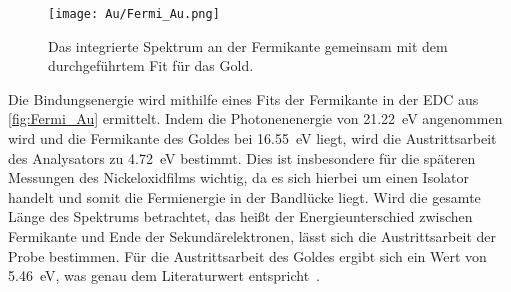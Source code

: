         \begin{figure}
            \centering
            \texttt{[image: Au/Fermi\_Au.png]}
            \caption{Das integrierte Spektrum an der Fermikante gemeinsam mit dem durchgeführtem Fit für das Gold.}
            \label{fig:Fermi_Au}
        \end{figure}
        Die Bindungsenergie wird mithilfe eines Fits der Fermikante in der EDC aus \autoref{fig:Fermi_Au} ermittelt.
        Indem die Photonenenergie von \SI{21.22}{\electronvolt} angenommen wird und die Fermikante des Goldes bei \SI{16.55}{\electronvolt} liegt, wird die Austrittsarbeit des Analysators zu \SI{4.72}{\electronvolt} bestimmt.
        Dies ist insbesondere für die späteren Messungen des Nickeloxidfilms wichtig, da es sich hierbei um einen Isolator handelt und somit die Fermienergie in der Bandlücke liegt.
        Wird die gesamte Länge des Spektrums betrachtet, das heißt der Energieunterschied zwischen Fermikante und Ende der Sekundärelektronen, lässt sich die Austrittsarbeit der Probe bestimmen.
        Für die Austrittsarbeit des Goldes ergibt sich ein Wert von \SI{5.46}{\electronvolt}, was genau dem Literaturwert entspricht~\cite{5A_4}.
   
